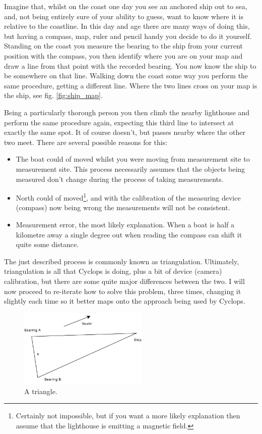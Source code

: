 \documentclass[10pt,a4paper,twoside]{article}
\begin{document}
Imagine that, whilst on the coast one day you see an anchored ship out to sea, and, not being entirely sure of your ability to guess, want to know where it is relative to the coastline.
In this day and age there are many ways of doing this, but having a compass, map, ruler and pencil handy you decide to do it yourself.
Standing on the coast you measure the bearing to the ship from your current position with the compass, you then identify where you are on your map and draw a line from that point with the recorded bearing. 
You now know the ship to be somewhere on that line. 
Walking down the coast some way you perform the same procedure, getting a different line. 
Where the two lines cross on your map is the ship, see fig. \ref{fig:ship_map}.

Being a particularly thorough person you then climb the nearby lighthouse and perform the same procedure again, expecting this third line to intersect at exactly the same spot.
It of course doesn't, but passes nearby where the other two meet.
There are several possible reasons for this:
\begin{itemize}
\item The boat could of moved whilst you were moving from measurement site to measurement site. This process necessarily assumes that the objects being measured don't change during the process of taking measurements.
\item North could of moved\footnote{Certainly not impossible, but if you want a more likely explanation then assume that the lighthouse is emitting a magnetic field.}, and with the calibration of the measuring device (compass) now being wrong the measurements will not be consistent.
\item Measurement error, the most likely explanation. When a boat is half a kilometre away a single degree out when reading the compass can shift it quite some distance.
\end{itemize}

The just described process is commonly known as triangulation.
Ultimately, triangulation is all that Cyclops is doing, plus a bit of device (camera) calibration, but there are some quite major differences between the two. I will now proceed to re-iterate how to solve this problem, three times, changing it slightly each time so it better maps onto the approach being used by Cyclops.

\begin{figure}[t]
 \centering
 \includegraphics[width=0.55\textwidth]{diags/tri_map}
 \caption{A triangle.}
 \label{fig:tri_map}
\end{figure}
\end{document}
